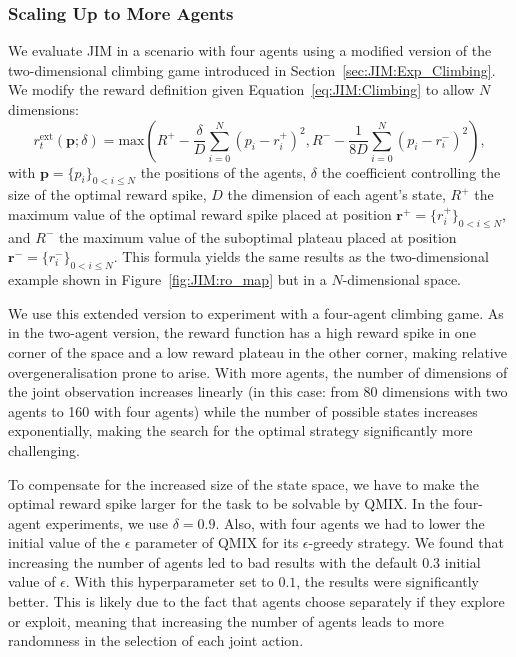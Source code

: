 \subsubsection{Scaling Up to More Agents}\label{sec:JIM:Exp:scaling}

We evaluate JIM in a scenario with four agents using a modified version of the two-dimensional climbing game introduced in Section~\ref{sec:JIM:Exp_Climbing}. We modify the reward definition given Equation~\ref{eq:JIM:Climbing} to allow $N$ dimensions: 
$$
r^{\text{ext}}_t(\mathbf{p};\delta)=\mathrm{max}\left(R^+-\frac{\delta}{D}\sum_{i=0}^{N}(p_i-r^+_i)^2,R^--\frac{1}{8D}\sum_{i=0}^{N}(p_i-r^-_i)^2\right),
$$
with $\mathbf{p}=\{p_i\}_{0<i\leq N}$ the positions of the agents, $\delta$ the coefficient controlling the size of the optimal reward spike, $D$ the dimension of each agent's state, $R^+$ the maximum value of the optimal reward spike placed at position $\mathbf{r}^+=\{r^+_i\}_{0<i\leq N}$, and $R^-$ the maximum value of the suboptimal plateau placed at position $\mathbf{r}^-=\{r^-_i\}_{0<i\leq N}$. This formula yields the same results as the two-dimensional example shown in Figure~\ref{fig:JIM:ro_map} but in a $N$-dimensional space.

We use this extended version to experiment with a four-agent climbing game. As in the two-agent version, the reward function has a high reward spike in one corner of the space and a low reward plateau in the other corner, making relative overgeneralisation prone to arise. With more agents, the number of dimensions of the joint observation increases linearly (in this case: from 80 dimensions with two agents to 160 with four agents) while the number of possible states increases exponentially, making the search for the optimal strategy significantly more challenging.

To compensate for the increased size of the state space, we have to make the optimal reward spike larger for the task to be solvable by QMIX. In the four-agent experiments, we use $\delta=0.9$. 
Also, with four agents we had to lower the initial value of the $\epsilon$ parameter of QMIX for its $\epsilon$-greedy strategy. We found that increasing the number of agents led to bad results with the default $0.3$ initial value of $\epsilon$. With this hyperparameter set to $0.1$, the results were significantly better. This is likely due to the fact that agents choose separately if they explore or exploit, meaning that increasing the number of agents leads to more randomness in the selection of each joint action. 

